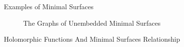 \documentclass[final]{beamer}
\newlength{\colwidth}
\begin{document}
\begin{frame}[t]
\begin{columns}[t]
\begin{column}{\colwidth}
\begin{block}{Examples of Minimal Surfaces}
\begin{figure}
       \caption{The Graphs of Unembedded Minimal Surfaces}
   \end{figure}
  \end{block}
  \vspace{\baselineskip}
  \vspace{\baselineskip}
  \begin{alertblock}{Holomorphic Functions And Minimal Surfaces Relationship}


\end{alertblock}
\end{column}
\end{columns}
\end{frame}
\end{document}
